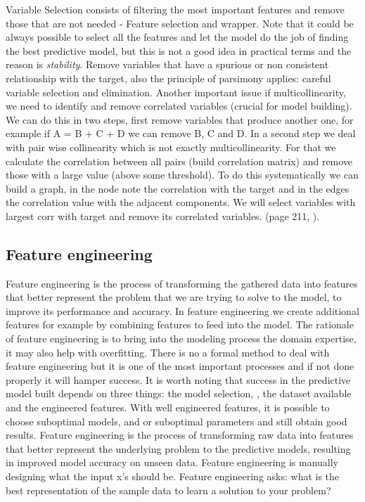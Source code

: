 \documentclass[11pt]{article}
\begin{document}
Variable Selection consists of filtering the most important features and remove those that are not needed - Feature selection and wrapper.
Note that it could be always possible to select all the features and let the model do the job of finding the best predictive model, but this is not a good idea in practical terms and the reason is \emph{stability}. Remove variables that have a spurious or non consistent relationship with the target, also the principle of parsimony applies: careful variable selection and elimination.
Another important issue if multicollinearity, we need to identify and remove correlated variables (crucial for model building). We can do this in two steps, first remove variables that produce another one, for example if A = B + C + D we can remove B, C and D.
In a second step we deal with pair wise collinearity which is not exactly multicollinearity. For that we calculate the correlation between all pairs (build correlation matrix) and remove those with a large value (above some threshold). To do this systematically we can build a graph, in the node note the correlation with the target and in the edges the correlation value with the adjacent components. We will select variables with largest corr with target and remove its correlated variables. (page 211, \cite{wu2012foundations}).


\subsection{Feature engineering}
Feature engineering is the process of transforming the gathered data into features that better represent the problem that we are trying to solve to the model, to improve its performance and accuracy. In feature engineering we create additional features for example by combining features to feed into the model. The rationale of feature engineering is to bring into the modeling process the domain expertise, it may also help with overfitting. 
There is no a formal method to deal with feature engineering but it is one of the most important processes and if not done properly it will hamper success. It is worth noting that success in the predictive model built depends on three things: the model selection, , the dataset available and the engineered features. With well engineered features, it is possible to choose suboptimal models, and or suboptimal parameters and still obtain good results. Feature engineering is the process of transforming raw data into features that better represent the underlying problem to the predictive models, resulting in improved model accuracy on unseen data. Feature engineering is manually designing what the input x’s should be. Feature engineering asks: what is the best representation of the sample data to learn a solution to your problem?
\end{document}
